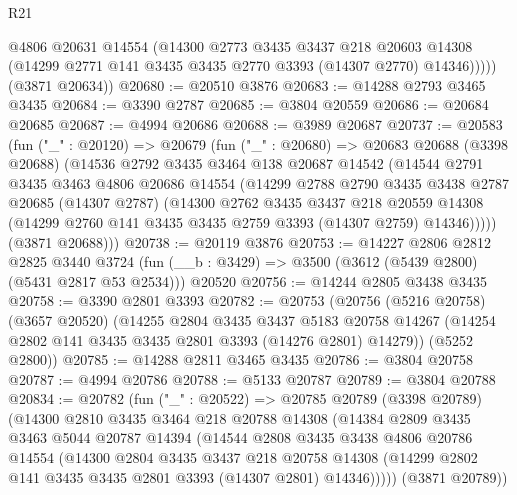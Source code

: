 \begin{lexlean}{R21}
\begin{coremodule}
            @4806
            @20631
            @14554
            (@14300
              @2773
              @3435
              @3437
              @218
              @20603
              @14308
              (@14299 @2771 @141 @3435 @3435 @2770 @3393 (@14307 @2770) @14346)))))
      (@3871 @20634))
@20680 := @20510 @3876
@20683 := @14288 @2793 @3465 @3435
@20684 := @3390 @2787
@20685 := @3804 @20559
@20686 := @20684 @20685
@20687 := @4994 @20686
@20688 := @3989 @20687
@20737 := @20583
    (fun ("_" : @20120) =>
    @20679
      (fun ("_" : @20680) =>
      @20683
        @20688
        (@3398 @20688)
        (@14536
          @2792
          @3435
          @3464
          @138
          @20687
          @14542
          (@14544
            @2791
            @3435
            @3463
            @4806
            @20686
            @14554
            (@14299
              @2788
              @2790
              @3435
              @3438
              @2787
              @20685
              (@14307 @2787)
              (@14300
                @2762
                @3435
                @3437
                @218
                @20559
                @14308
                (@14299 @2760 @141 @3435 @3435 @2759 @3393 (@14307 @2759) @14346)))))
        (@3871 @20688)))
@20738 := @20119 @3876
@20753 := @14227
    @2806
    @2812
    @2825
    @3440
    @3724
    (fun (__b : @3429) => @3500 (@3612 (@5439 @2800) (@5431 @2817 @53 @2534)))
    @20520
@20756 := @14244 @2805 @3438 @3435
@20758 := @3390 @2801 @3393
@20782 := @20753
    (@20756
      (@5216 @20758)
      (@3657 @20520)
      (@14255
        @2804
        @3435
        @3437
        @5183
        @20758
        @14267
        (@14254 @2802 @141 @3435 @3435 @2801 @3393 (@14276 @2801) @14279))
      (@5252 @2800))
@20785 := @14288 @2811 @3465 @3435
@20786 := @3804 @20758
@20787 := @4994 @20786
@20788 := @5133 @20787
@20789 := @3804 @20788
@20834 := @20782
    (fun ("_" : @20522) =>
    @20785
      @20789
      (@3398 @20789)
      (@14300
        @2810
        @3435
        @3464
        @218
        @20788
        @14308
        (@14384
          @2809
          @3435
          @3463
          @5044
          @20787
          @14394
          (@14544
            @2808
            @3435
            @3438
            @4806
            @20786
            @14554
            (@14300
              @2804
              @3435
              @3437
              @218
              @20758
              @14308
              (@14299 @2802 @141 @3435 @3435 @2801 @3393 (@14307 @2801) @14346)))))
      (@3871 @20789))

\end{coremodule}
\end{lexlean}
